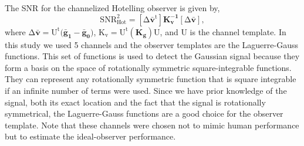 The SNR for the channelized Hotelling observer is given by,
%
\begin{equation}
\label{SNR hot}
\mathrm{SNR^2_{Hot} = [\Delta \mathbf{\bar{v}}^t]\mathbf{K_v^{-1}}[\Delta \mathbf{\bar{v}}]},
\end{equation}
%
where $\mathrm{\Delta \mathbf{\bar{v}} = U^t(\mathbf{\bar{g}_1}-\mathbf{\bar{g}_0)}}$, $\mathrm{K_v= U^t(\mathbf{K_g})U}$, and $\mathrm{U}$ is the channel template.  In this study we used 5 channels and the observer templates are the Laguerre-Gauss functions.  This set of functions is used to detect the Gaussian signal because they form a basis on the space of rotationally symmetric square-integrable functions.  They can represent any rotationally symmetric function that is square integrable if an infinite number of terms were used.  Since we have prior knowledge of the signal, both its exact location and the fact that the signal is rotationally symmetrical, the Laguerre-Gauss functions are a good choice for the observer template.  Note that these channels were chosen not to mimic human performance but to estimate the ideal-observer performance.

